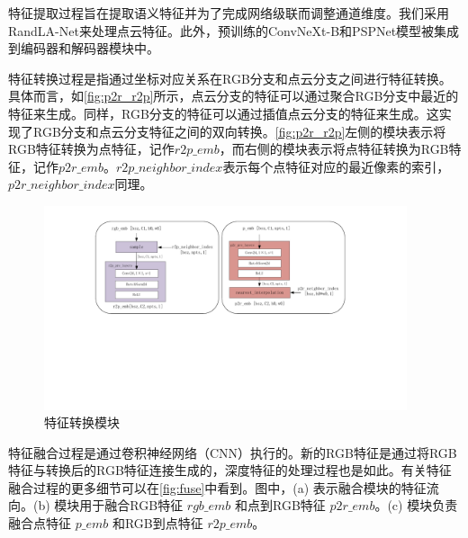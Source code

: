 特征提取过程旨在提取语义特征并为了完成网络级联而调整通道维度。我们采用RandLA-Net\cite{hu2020randla}来处理点云特征。此外，预训练的ConvNeXt-B\cite{Liu2022ACF}和PSPNet\cite{zhao2017pyramid}模型被集成到编码器和解码器模块中。

特征转换过程是指通过坐标对应关系在RGB分支和点云分支之间进行特征转换。具体而言，如\autoref{fig:p2r_r2p}所示，点云分支的特征可以通过聚合RGB分支中最近的特征来生成。同样，RGB分支的特征可以通过插值点云分支的特征来生成。这实现了RGB分支和点云分支特征之间的双向转换。\autoref{fig:p2r_r2p}左侧的模块表示将RGB特征转换为点特征，记作$r2p\_emb$，而右侧的模块表示将点特征转换为RGB特征，记作$p2r\_emb$。$r2p\_neighbor\_index$表示每个点特征对应的最近像素的索引，$p2r\_neighbor\_index$同理。

\begin{figure}[htbp]
    \centering
    \includegraphics[width=0.95\textwidth]{figure/hipose/p2r_r2p.pdf}
    \caption{特征转换模块}
    \label{fig:p2r_r2p}
\end{figure}

特征融合过程是通过卷积神经网络（CNN）执行的。新的RGB特征是通过将RGB特征与转换后的RGB特征连接生成的，深度特征的处理过程也是如此。有关特征融合过程的更多细节可以在\autoref{fig:fuse}中看到。图中，(a) 表示融合模块的特征流向。(b) 模块用于融合RGB特征 $rgb\_emb$ 和点到RGB特征 $p2r\_emb$。(c) 模块负责融合点特征 $p\_emb$ 和RGB到点特征 $r2p\_emb$。

